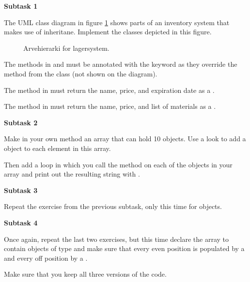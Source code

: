 \textbf{Subtask 1}

The UML class diagram in figure \ref{inheritance:inventory:uml} shows parts of an inventory system that makes use of inheritane. Implement the classes depicted in this figure.

\begin{figure}[tbp]
  \caption{\label{inheritance:inventory:uml} Arvehierarki for lagersystem.}
\end{figure}

The  methods in  and  must be annotated with the  keyword as they override the method from the  class (not shown on the diagram).

The  method in  must return the name, price, and expiration date as a .

The  method in  must return the name, price, and list of materials as a .

\textbf{Subtask 2}

Make in your own  method an array that can hold 10  objects. Use a look to add a  object to each element in this array.

Then add a loop in which you call the  method on each of the  objects in your array and print out the resulting string with .

\textbf{Subtask 3}

Repeat the exercise from the previous subtask, only this time for  objects.

\textbf{Subtask 4}

Once again, repeat the last two exercises, but this time declare the array to contain objects of type  and make sure that every even position is populated by a  and every off position by a .

Make sure that you keep all three versions of the code.

